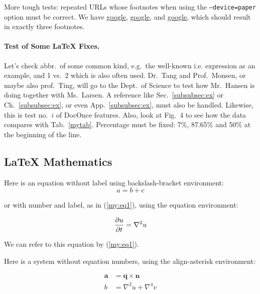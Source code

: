 \documentclass[%
oneside,                 %
final,                   %
10pt]{article}
\theoremstyle{definition}
\begin{document}
\begin{enumerate}

More tough tests: repeated URLs whose footnotes when using the
\texttt{--device=paper} option must be correct. We have
\href{{https://google.com}}{google}, \href{{https://google.com}}{google}, and
\href{{https://google.com}}{google}, which should result in exactly three
footnotes.

\paragraph{Test of Some {\LaTeX} Fixes.}
Let's check abbr.~of some common kind, e.g.~the well-known i.e.
expression as an example, and 1 vs.~2 which is also often used.
Dr.~Tang and Prof.~Monsen, or maybe also prof.~Ting,
will go to the Dept.~of Science to test how Mr.~Hansen is doing together
with Ms.~Larsen. A reference like Sec.~\vref{subsubsec:ex} or
Ch.~\vref{subsubsec:ex}, or even App.~\vref{subsubsec:ex}, must also be
handled. Likewise, this is test no.~$i$ of DocOnce features.
Also, look at Fig.~4 to see how the data compares with Tab.~\vref{mytab}.
Percentage must be fixed: 7\%,  87.65\% and
50\% at the beginning of the line.


\subsection{{\LaTeX} Mathematics}

Here is an equation without label using backslash-bracket environment:
\[ a = b + c \]

or with number and label, as in (\ref{my:eq1}), using the equation environment:

\begin{equation}
{\partial u\over\partial t} = \nabla^2 u \label{my:eq1}
\end{equation}

We can refer to this equation by (\ref{my:eq1}).

Here is a system without equation numbers, using the align-asterisk environment:

\begin{align*}
\pmb{a} &= \pmb{q}\times\pmb{n} \\ 
b &= \nabla^2 u + \nabla^4 v
\end{align*}


\end{enumerate}
\end{document}
